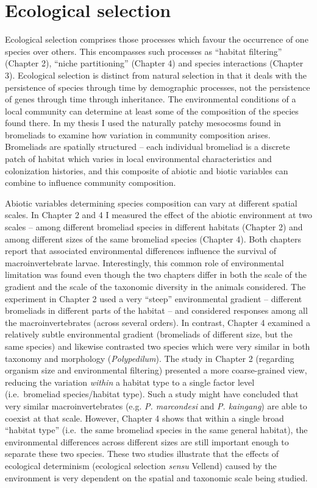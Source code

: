 \section{Ecological selection}\label{ecological-selection}

Ecological selection comprises those processes which favour the
occurrence of one species over others. This encompasses such processes
as ``habitat filtering'' (Chapter 2), ``niche partitioning'' (Chapter 4)
and species interactions (Chapter 3). Ecological selection is distinct
from natural selection in that it deals with the persistence of species
through time by demographic processes, not the persistence of genes
through time through inheritance. The environmental conditions of a
local community can determine at least some of the composition of the
species found there. In my thesis I used the naturally patchy mesocosms
found in bromeliads to examine how variation in community composition
arises. Bromeliads are spatially structured -- each individual bromeliad
is a discrete patch of habitat which varies in local environmental
characteristics and colonization histories, and this composite of
abiotic and biotic variables can combine to influence community
composition.

Abiotic variables determining species composition can vary at different
spatial scales. In Chapter 2 and 4 I measured the effect of the abiotic
environment at two scales -- among different bromeliad species in
different habitats (Chapter 2) and among different sizes of the same
bromeliad species (Chapter 4). Both chapters report that associated
environmental differences influence the survival of macroinvertebrate
larvae. Interestingly, this common role of environmental limitation was
found even though the two chapters differ in both the scale of the
gradient and the scale of the taxonomic diversity in the animals
considered. The experiment in Chapter 2 used a very ``steep''
environmental gradient -- different bromeliads in different parts of the
habitat -- and considered responses among all the macroinvertebrates
(across several orders). In contrast, Chapter 4 examined a relatively
subtle environmental gradient (bromeliads of different size, but the same species) and likewise contrasted
two species which were very similar in both taxonomy and morphology
(\emph{Polypedilum}). The study in Chapter 2 (regarding organism size and environmental filtering) presented a more coarse-grained view, reducing the variation
\emph{within} a habitat type to a single factor level (i.e.~bromeliad species/habitat type). Such a study might have
concluded that very similar macroinvertebrates (e.g. \emph{P. marcondesi} and
\emph{P. kaingang}) are able to coexist at that scale. However, Chapter 4
shows that within a single broad ``habitat type'' (i.e.~the same
bromeliad species in the same general habitat), the environmental
differences across different sizes are still important enough to
separate these two species. These two studies illustrate that the
effects of ecological determinism (ecological selection \emph{sensu}
Vellend) caused by the environment is very dependent on the spatial and
taxonomic scale being studied.


